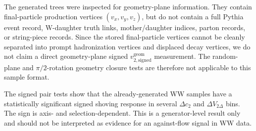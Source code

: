 The generated trees were inspected for geometry-plane information.  They contain
final-particle production vertices \((v_x,v_y,v_z)\), but do not contain a full
Pythia event record, W-daughter truth links, mother/daughter indices, parton
records, or string-piece records.  Since the stored final-particle vertices
cannot be cleanly separated into prompt hadronization vertices and displaced
decay vertices, we do not claim a direct geometry-plane signed
\(v_{2,\mathrm{signed}}^{\mathrm{geom}}\) measurement.  The random-plane and
\(\pi/2\)-rotation geometry closure tests are therefore not applicable to this
sample format.

The signed pair tests show that the already-generated WW samples have a
statistically significant signed shoving response in several \(\Delta c_2\) and
\(\Delta V_{2\Delta}\) bins.  The sign is axis- and selection-dependent.  This
is a generator-level result only and should not be interpreted as evidence for
an against-flow signal in WW data.
